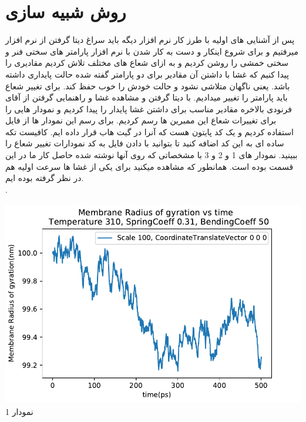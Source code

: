 \documentclass[12pt,onecolumn,a4paper]{report}
\begin{document}
\section{\LARGE{روش شبیه سازی}}
پس از آشنایی های اولیه با طرز کار نرم افزار دیگه باید سراغ دیتا گرفتن از نرم افزار میرفتیم و برای شروع اینکار و دست به کار شدن با نرم افزار پارامتر های سختی فنر و سختی خمشی را روشن کردیم و به ازای شعاع های مختلف تلاش کردیم مقادیری را پیدا کنیم که غشا با داشتن آن مقادیر برای دو پارامتر گفته شده حالت پایداری داشته باشد. یعنی ناگهان متلاشی نشود و حالت خودش را خوب حفظ کند. برای تغییر شعاع باید پارامتر  را تغییر میدادیم. با دیتا گرفتن  و مشاهده غشا و راهنمایی گرفتن از آقای فرنودی بالاخره مقادیر مناسب برای داشتن غشا پایدار را پیدا کردیم و نمودار هایی را برای تغییرات شعاع این ممبرین ها رسم کردیم. برای رسم این نمودار ها از فایل  استفاده کردیم و یک کد پایتون هست که آنرا در گیت هاب قرار داده ایم. کافیست تکه ساده ای به این کد اضافه کنید تا بتوانید با دادن فایل  به کد نمودارات تغییر شعاع را ببینید. نمودار های 1 و 2 و 3 با مشخصاتی که روی آنها نوشته شده حاصل کار ما در این قسمت بوده است. همانطور که مشاهده میکنید برای یکی از غشا ها سرعت اولیه هم در نظر گرفته بوده ایم.\\.
\begin{center}
\includegraphics[width=16cm, height=9cm]{1.pdf}\\
\caption{نمودار 1}
\end{center}\\
\end{document}
